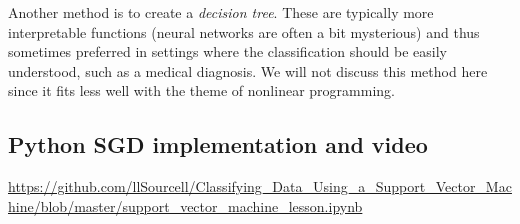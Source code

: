 Another method is to create a \emph{decision tree}.  These are typically more interpretable functions (neural networks are often a bit mysterious) and thus sometimes preferred in settings where the classification should be easily understood, such as a medical diagnosis.  We will not discuss this method here since it fits less well with the theme of nonlinear programming.




\subsection{Python SGD implementation and video}
\url{https://github.com/llSourcell/Classifying_Data_Using_a_Support_Vector_Machine/blob/master/support_vector_machine_lesson.ipynb}



%
%
